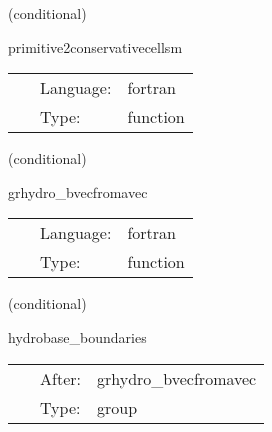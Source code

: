 \documentclass{article}
\begin{document}
\vspace{5mm}

   (conditional) 

\hspace{5mm} primitive2conservativecellsm 

\hspace{5mm}{\it convert initial data given in primive variables to conserved variables - mhd version } 


\hspace{5mm}

 \begin{tabular*}{160mm}{cll} 
~ & Language:  & fortran \\ 
~ & Type:  & function \\ 
\end{tabular*} 


\vspace{5mm}

   (conditional) 

\hspace{5mm} grhydro\_bvecfromavec 

\hspace{5mm}{\it populate bvec from avec } 


\hspace{5mm}

 \begin{tabular*}{160mm}{cll} 
~ & Language:  & fortran \\ 
~ & Type:  & function \\ 
\end{tabular*} 


\vspace{5mm}

   (conditional) 

\hspace{5mm} hydrobase\_boundaries 

\hspace{5mm}{\it call boundary conditions after magnetic field initial data setup } 


\hspace{5mm}

 \begin{tabular*}{160mm}{cll} 
~ & After:  & grhydro\_bvecfromavec \\ 
~ & Type:  & group \\ 
\end{tabular*} 
\end{document}
